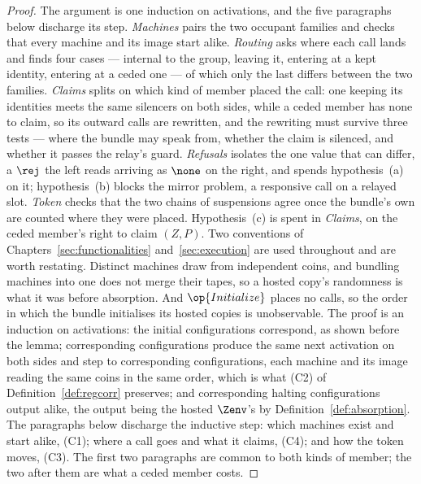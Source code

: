 \documentclass[10pt,oneside,openany]{book}
\theoremstyle{accentdef}
\theoremstyle{accentplain}
\begin{document}
\begin{proof}
The argument is one induction on activations, and the five paragraphs below discharge its step.
\emph{Machines} pairs the two occupant families and checks that every machine and its image start
alike. \emph{Routing} asks where each call lands and finds four cases --- internal to the group,
leaving it, entering at a kept identity, entering at a ceded one --- of which only the last differs
between the two families. \emph{Claims} splits on which kind of member placed the call: one keeping
its identities meets the same silencers on both sides, while a ceded member has none to claim, so
its outward calls are rewritten, and the rewriting must survive three tests --- where the bundle may
speak from, whether the claim is silenced, and whether it passes the relay's guard.
\emph{Refusals} isolates the one value that can differ, a $\rej$ the left reads arriving as $\none$
on the right, and spends hypothesis~(a) on it; hypothesis~(b) blocks the mirror problem, a
responsive call on a relayed slot. \emph{Token} checks that the two chains of suspensions agree once
the bundle's own are counted where they were placed. Hypothesis~(c) is spent in \emph{Claims}, on
the ceded member's right to claim $(Z,P)$.
Two conventions of Chapters~\ref{sec:functionalities} and~\ref{sec:execution} are used throughout and
are worth restating. Distinct machines draw from independent coins, and bundling machines into one
does not merge their tapes, so a hosted copy's randomness is what it was before absorption. And
$\op{Initialize}$ places no calls, so the order in which the bundle initialises its hosted copies is
unobservable. The proof is an induction on activations: the initial configurations correspond, as
shown before the lemma; corresponding configurations produce the same next activation on both sides
and step to corresponding configurations, each machine and its image reading the same coins in the
same order, which is what (C2) of Definition~\ref{def:regcorr} preserves; and corresponding halting
configurations output alike, the output being the hosted $\Zenv$'s by
Definition~\ref{def:absorption}. The paragraphs below discharge the inductive step: which machines
exist and start alike, (C1); where a call goes and what it claims, (C4); and how the token moves,
(C3). The first two paragraphs are common to both kinds of member; the two after them are what a
ceded member costs.


\end{proof}
\end{document}
